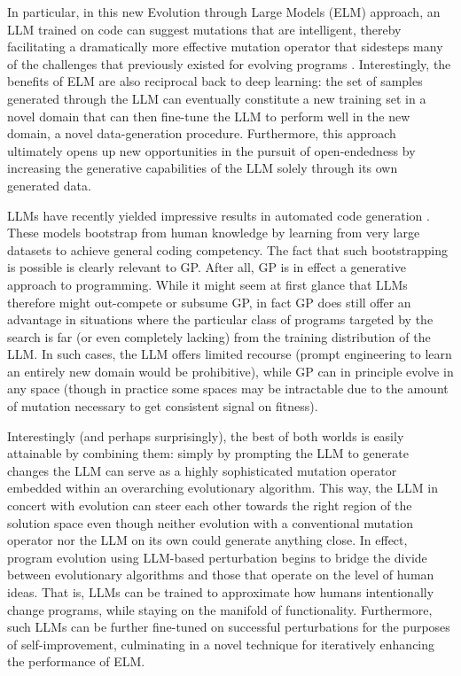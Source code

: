 \documentclass{article}
\begin{document}
In particular, in this new Evolution through Large Models (ELM) approach, an LLM trained on code can suggest mutations that are intelligent, thereby facilitating a dramatically more effective mutation operator that sidesteps many of the challenges that previously existed for evolving programs \cite{oneill:2010open}.  Interestingly, the benefits of ELM are also reciprocal back to deep learning: the set of samples generated through the LLM can eventually constitute a new training set in a novel domain that can then fine-tune the LLM to perform well in the new domain, a novel data-generation procedure. Furthermore, this approach ultimately opens up new opportunities in the pursuit of open-endedness by increasing the generative capabilities of the LLM solely through its own generated data.

LLMs have recently yielded impressive results in automated code generation \cite{chen:codex,li2022competition}. These models bootstrap from human knowledge by learning from very large datasets to achieve general coding competency.  The fact that such bootstrapping is possible is clearly relevant to GP.  After all, GP is in effect a generative approach to programming.  While it might seem at first glance that LLMs therefore might out-compete or subsume GP, in fact GP does still offer an advantage in situations where the particular class of programs targeted by the search is far (or even completely lacking) from the training distribution of the LLM.  In such cases, the LLM offers limited recourse (prompt engineering to learn an entirely new domain would be prohibitive), while GP can in principle evolve in any space (though in practice some spaces may be intractable due to the amount of mutation necessary to get consistent signal on fitness).

Interestingly (and perhaps surprisingly), the best of both worlds is easily attainable by combining them: simply by prompting the LLM to generate changes 
the LLM can serve as a highly sophisticated mutation operator embedded within an overarching evolutionary algorithm.  This way, the LLM in concert with evolution can steer each other towards the right region of the solution space even though neither evolution with a conventional mutation operator nor the LLM on its own could generate anything close.  
In effect, program evolution using LLM-based perturbation begins to bridge the divide between evolutionary algorithms and those that operate on the level of human ideas. That is, LLMs can be trained to approximate how humans intentionally change programs, while staying on the manifold of functionality. Furthermore, such LLMs can be further fine-tuned on successful perturbations for the purposes of self-improvement, culminating in a novel technique for iteratively enhancing the performance of ELM.
\end{document}

